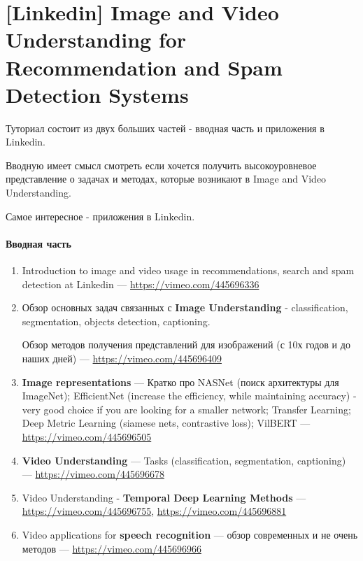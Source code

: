 
\section*{[Linkedin] Image and Video Understanding for Recommendation and Spam Detection Systems}

Туториал состоит из двух больших частей - вводная часть и приложения в Linkedin.  

Вводную имеет смысл смотреть если хочется получить высокоуровневое представление о задачах и методах, которые возникают в Image and Video Understanding.

Самое интересное - приложения в Linkedin.

\paragraph{Вводная часть}

\begin{enumerate}
    \item Introduction to image and video usage in recommendations, search and spam detection at Linkedin --- \url{https://vimeo.com/445696336}
    \item Обзор основных задач связанных с \textbf{Image Understanding} - classification, segmentation, objects detection, captioning.
    
        Обзор методов получения представлений для изображений (с 10х годов и до наших дней) --- \url{https://vimeo.com/445696409}
    \item \textbf{Image representations} --- Кратко про NASNet (поиск архитектуры для ImageNet); EfficientNet (increase the efficiency, while maintaining accuracy) - very good choice if you are looking for a smaller network; Transfer Learning; Deep Metric Learning (siamese nets, contrastive loss); VilBERT --- \url{https://vimeo.com/445696505}
    \item \textbf{Video Understanding} --- Tasks (classification, segmentation, captioning)  --- \url{https://vimeo.com/445696678}
    \item Video Understanding - \textbf{Temporal Deep Learning Methods} --- \url{https://vimeo.com/445696755}, \url{https://vimeo.com/445696881}
    \item Video applications for \textbf{speech recognition} --- обзор современных и не очень методов --- \url{https://vimeo.com/445696966}
\end{enumerate}

